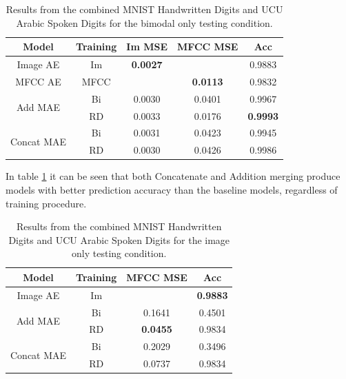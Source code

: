 \begin{table}
	\centering
		\begin{tabular}{|c|c|c|c|c|}
		\hline
		Model & Training & Im MSE & MFCC MSE &  Acc \\ \hline
				Image AE & Im & 	\textbf{0.0027}	&	       			& 	0.9883			\\ \hline		
				MFCC AE & MFCC & 		    		& 	\textbf{0.0113} &	0.9832			\\ \hline		
\multirow{2}{*}{Add MAE} & Bi & 	0.0030			&	0.0401			&	0.9967			\\ \cline{2-5}
						  & RD &	0.0033			&	0.0176			&	\textbf{0.9993}	\\ \hline	
		
\multirow{2}{*}{Concat MAE} & Bi & 0.0031			&	0.0423			&	0.9945			\\ \cline{2-5}		
							 & RD & 0.0030			&	0.0426			&	0.9986			\\ \hline
		\end{tabular}
		\caption{Results from the combined MNIST Handwritten Digits and UCU Arabic Spoken Digits for the bimodal only testing condition.}
		\label{tab:mnist_ucu_bi_res}

\end{table}

In table \ref{tab:mnist_ucu_bi_res} it can be seen that both Concatenate and Addition merging produce models with better prediction accuracy than the baseline models, regardless of training procedure.

\begin{table}
	\centering
		\begin{tabular}{|c|c|c|c|}
		\hline
		Model & Training &  MFCC MSE &  Acc \\ \hline
		Image AE & Im 		&  		    			& \textbf{0.9883}	\\ \hline		
\multirow{2}{*}{Add MAE} & Bi & 	0.1641			& 0.4501 			\\ \cline{2-4}
						  & RD & \textbf{0.0455}	& 0.9834 			\\ \hline	
		
\multirow{2}{*}{Concat MAE} & Bi & 	0.2029		&	0.3496 			\\ \cline{2-4}		
							 & RD & 	0.0737		&	0.9834 			\\ \hline
		\end{tabular}
		\caption{Results from the combined MNIST Handwritten Digits and UCU Arabic Spoken Digits for the image only testing condition.}
		\label{tab:mnist_ucu_im_res}

\end{table}

